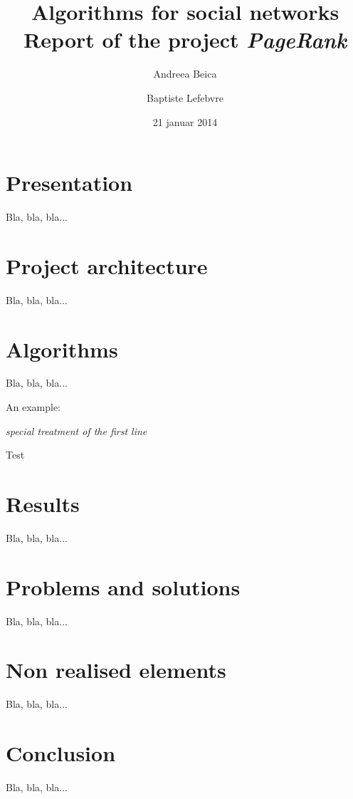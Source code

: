 \documentclass[pdftex,12pt,a4paper]{article}
\begin{document}
\title{
	\Large \textbf{Algorithms for social networks} \\
	\textsf{Report of the project \emph{PageRank}}
}
\author{Andreea Beica \and Baptiste Lefebvre}
\date{21 januar 2014}

\maketitle


\section{Presentation}

Bla, bla, bla...


\section{Project architecture}

Bla, bla, bla...


\section{Algorithms}

Bla, bla, bla...

An example:

\IncMargin{1em}
\begin{algorithm}
\Indm
{}
\Indp
\BlankLine
\emph{special treatment of the first line}\;
\caption{Test}\label{algo_disjdecomp}
\end{algorithm}\DecMargin{1em}


\section{Results}

Bla, bla, bla...


\section{Problems and solutions}

Bla, bla, bla...


\section{Non realised elements}

Bla, bla, bla...


\section{Conclusion}

Bla, bla, bla...
\end{document}
